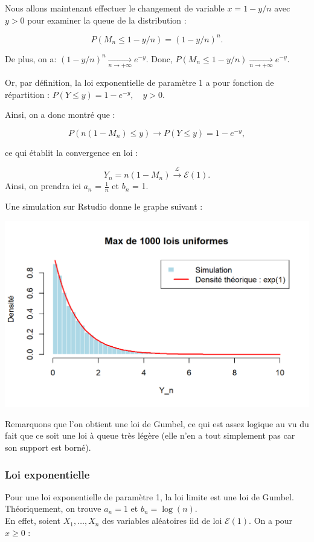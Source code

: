 \documentclass{article}
\theoremstyle{plain}
\theoremstyle{definition}
\theoremstyle{plain}
\begin{document}
\noindent Nous allons maintenant effectuer le changement de variable $ x = 1 - y/n $ avec $y > 0 $ pour examiner la queue de la distribution :

\[
P(M_n \leq 1 - y/n) = (1 - y/n)^n.
\]

\noindent De plus, on a: $(1 - y/n)^n \xrightarrow[n \to +\infty]{} e^{-y} $. Donc, $ P(M_n \leq 1 - y/n) \xrightarrow[n \to +\infty]{} e^{-y} $.


\noindent Or, par définition, la loi exponentielle de paramètre 1 a pour fonction de répartition : $ P(Y \leq y) = 1 - e^{-y}, \quad y > 0. $

\noindent Ainsi, on a donc montré que :

\[
P(n(1 - M_n) \leq y) \to P(Y \leq y) = 1 - e^{-y},
\]

\noindent ce qui établit la convergence en loi :

\[
Y_n = n(1 - M_n) \xrightarrow{\mathcal{L}} \mathcal{E}(1).
\] 
\noindent Ainsi, on prendra ici $a_n$ = $\frac{1}{n}$ et $b_n$ = 1.

\noindent Une simulation sur Rstudio donne le graphe suivant :

\begin{center}
	\includegraphics[scale=0.8]{./images/Max_Uniforme.png} 
\end{center}

\noindent Remarquons que l'on obtient une loi de Gumbel, ce qui est assez logique au vu du fait que ce soit une loi à queue très légère (elle n'en a tout simplement pas car son support est borné).

\subsubsection{Loi exponentielle}
\noindent Pour une loi exponentielle de paramètre 1, la loi limite est une loi de Gumbel. Théoriquement, on trouve $a_n = 1 $ et $b_n = \log(n) $. \\
\noindent En effet, soient $X_1, \dots, X_n$ des variables aléatoires iid de loi $\mathcal{E}(1)$. On a pour $ x \geq 0 $ :
\end{document}
